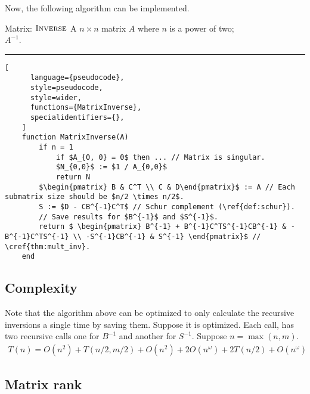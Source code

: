 Now, the following algorithm can be implemented.
\begin{programruledcaption}{Matrix: \(\textsc{Inverse}\)}
    \noindent
     A \(n \times n\) matrix \(A\) where \(n\) is a power of two; \\
     \(A^{-1}\). 

    \noindent \hrule
    \begin{lstlisting}[
      language={pseudocode},
      style=pseudocode,
      style=wider,
      functions={MatrixInverse},
      specialidentifiers={},
    ]
    function MatrixInverse(A) 
        if n = 1  
            if $A_{0, 0} = 0$ then ... // Matrix is singular.
            $N_{0,0}$ := $1 / A_{0,0}$
            return N
        $\begin{pmatrix} B & C^T \\ C & D\end{pmatrix}$ := A // Each submatrix size should be $n/2 \times n/2$.
        S := $D - CB^{-1}C^T$ // Schur complement (\ref{def:schur}).
        // Save results for $B^{-1}$ and $S^{-1}$.
        return $ \begin{pmatrix} B^{-1} + B^{-1}C^TS^{-1}CB^{-1} & -B^{-1}C^TS^{-1} \\ -S^{-1}CB^{-1} & S^{-1} \end{pmatrix}$ // \cref{thm:mult_inv}.
    end
    \end{lstlisting}
\end{programruledcaption}

\subsection*{Complexity}
Note that the algorithm above can be optimized to only calculate the recursive inversions a single time by saving them.
Suppose it is optimized.
Each call, has two recursive calls one for \(B^{-1}\) and another for \(S^{-1}\).
Suppose \(n = \max(n, m)\).
\begin{align}
    T(n) = O(n^2) + T(n/2, m/2) + O(n^2) + 2O(n^\omega) + 2T(n/2) + O(n^\omega)
\end{align}

\subsection{Matrix rank}
